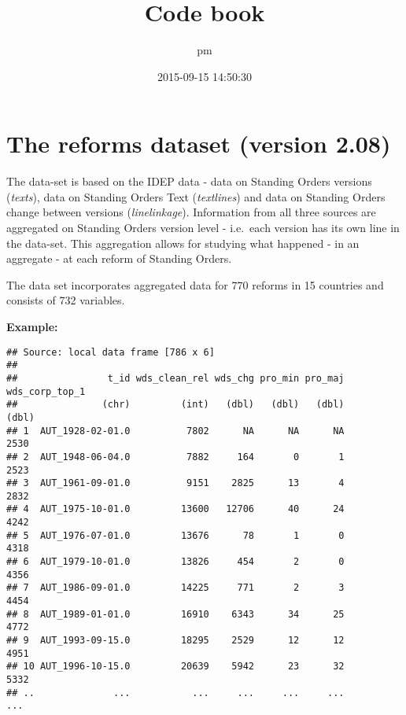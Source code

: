 \documentclass[]{article}
\title{Code book}
\author{pm}
\date{2015-09-15 14:50:30}
\newenvironment{Shaded}{\begin{snugshade}}{\end{snugshade}}
\newcommand{\KeywordTok}[1]{\textcolor[rgb]{0.13,0.29,0.53}{\textbf{{#1}}}}
\newcommand{\StringTok}[1]{\textcolor[rgb]{0.31,0.60,0.02}{{#1}}}
\newcommand{\NormalTok}[1]{{#1}}
\begin{document}
\maketitle

\section{The reforms dataset (version
2.08)}\label{the-reforms-dataset-version-2.08}

The data-set is based on the IDEP data - data on Standing Orders
versions (\emph{texts}), data on Standing Orders Text (\emph{textlines})
and data on Standing Orders change between versions
(\emph{linelinkage}). Information from all three sources are aggregated
on Standing Orders version level - i.e.~each version has its own line in
the data-set. This aggregation allows for studying what happened - in an
aggregate - at each reform of Standing Orders.

The data set incorporates aggregated data for 770 reforms in 15
countries and consists of 732 variables.

\textbf{Example:}

\begin{Shaded}
\end{Shaded}

\begin{verbatim}
## Source: local data frame [786 x 6]
## 
##                t_id wds_clean_rel wds_chg pro_min pro_maj wds_corp_top_1
##               (chr)         (int)   (dbl)   (dbl)   (dbl)          (dbl)
## 1  AUT_1928-02-01.0          7802      NA      NA      NA           2530
## 2  AUT_1948-06-04.0          7882     164       0       1           2523
## 3  AUT_1961-09-01.0          9151    2825      13       4           2832
## 4  AUT_1975-10-01.0         13600   12706      40      24           4242
## 5  AUT_1976-07-01.0         13676      78       1       0           4318
## 6  AUT_1979-10-01.0         13826     454       2       0           4356
## 7  AUT_1986-09-01.0         14225     771       2       3           4454
## 8  AUT_1989-01-01.0         16910    6343      34      25           4772
## 9  AUT_1993-09-15.0         18295    2529      12      12           4951
## 10 AUT_1996-10-15.0         20639    5942      23      32           5332
## ..              ...           ...     ...     ...     ...            ...
\end{verbatim}
\end{document}
